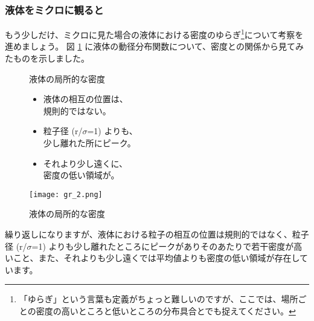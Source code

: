 \documentclass[uplatex,dvipdfmx,a4paper,11pt]{jsarticle}
\begin{document}
\subsubsection{液体をミクロに観ると}
もう少しだけ、ミクロに見た場合の液体における密度のゆらぎ\footnote{
	「ゆらぎ」という言葉も定義がちょっと難しいのですが、ここでは、場所ごとの密度の高いところと低いところの分布具合とでも捉えてください。
}について考察を進めましょう。
図 \ref{fig:liquid_doukei} に液体の動径分布関数について、密度との関係から見てみたものを示しました。
\begin{figure}[htb]
	\begin{center}
		\begin{minipage}{0.4\textwidth}
			\large
			\begin{itembox}[l]{液体の局所的な密度}
				\begin{itemize}
					\item 液体の相互の位置は、\\規則的ではない。
					\item 粒子径 (r/$\sigma$=1) よりも、\\少し離れた所にピーク。
					\item それより少し遠くに、\\密度の低い領域が。
				\end{itemize}
			\end{itembox}
		\end{minipage}
		\begin{minipage}{0.5\textwidth}
			\begin{center}
			\texttt{[image: gr\_2.png]}
			\end{center}
		\end{minipage}
		\caption{液体の局所的な密度}
		\label{fig:liquid_doukei}
	\end{center}
\end{figure}

繰り返しになりますが、液体における粒子の相互の位置は規則的ではなく、粒子径 (r/$\sigma$=1) よりも少し離れたところにピークがありそのあたりで若干密度が高いこと、また、それよりも少し遠くでは平均値よりも密度の低い領域が存在しています。
\end{document}
